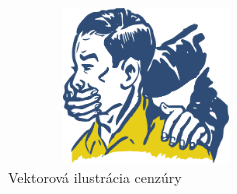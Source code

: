 \documentclass{artikel1}
\begin{document}
\begin{figure}[htbp]
    \begin{center}
        \includegraphics[width=0.65\textwidth, height=155px]{censored-nospeaking.eps}
    \end{center}
    \caption{Vektorová ilustrácia cenzúry}
    \label{censored-nospeaking}
\end{figure}

\printbibliography[heading=bibintoc]
\begingroup
\let\clearpage\relax
\printindex
\endgroup
\end{document}
